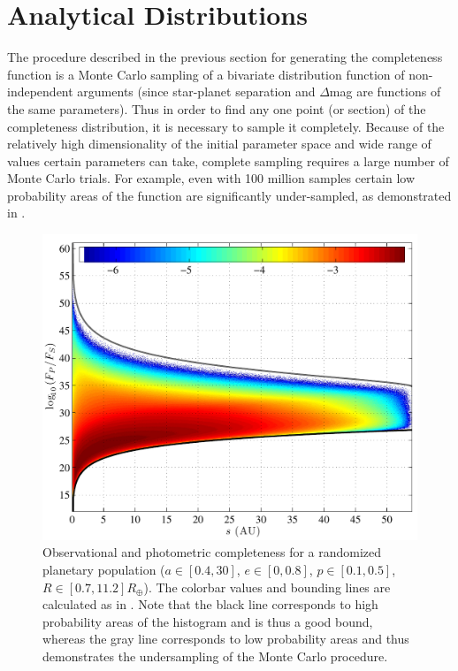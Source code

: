 \section{Analytical Distributions}\label{sec:analytic_dists}
The procedure described in the previous section for generating the completeness function is a Monte Carlo sampling of a bivariate distribution function of non-independent arguments (since star-planet separation and $\Delta$mag are functions of the same parameters).  Thus in order to find any one point (or section) of the completeness distribution, it is necessary to sample it completely.  Because of the relatively high dimensionality of the initial parameter space and wide range of values certain parameters can take, complete sampling requires a large number of Monte Carlo trials.  For example, even with 100 million samples certain low probability areas of the function are significantly under-sampled, as demonstrated in .

\begin{figure}[ht]
\centering
\includegraphics[width=5.5in]{./figures/undersampled_comp_pdf}
 \caption[Undersampled observation PDF]{Observational and photometric completeness for a randomized planetary population  ($a \in [0.4, 30]$, $e \in [0, 0.8]$, $p \in [0.1, 0.5]$, $R \in [0.7, 11.2]R_\oplus$).  The colorbar values and bounding lines are calculated as in . Note that the black line corresponds to high probability areas of the histogram and is thus a good bound, whereas the gray line corresponds to low probability areas and thus demonstrates the undersampling of the Monte Carlo procedure.}
\label{fig:undersampled_comp_pdf} 
\end{figure} 

